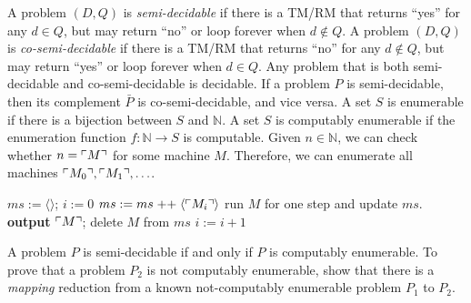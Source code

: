  A problem $(D,Q)$ is \emph{semi-decidable} if there is a TM/RM that returns ``yes'' for any $d \in Q$, but may return ``no'' or loop forever when $d \notin Q$.
 A problem $(D, Q)$ is \emph{co-semi-decidable} if there is a TM/RM that returns ``no'' for any $d \notin Q$, but may return ``yes'' or loop forever when $d \in Q$.
 Any problem that is both semi-decidable and co-semi-decidable is decidable.
 If a problem $P$ is semi-decidable, then its complement $\bar{P}$ is co-semi-decidable, and vice versa.
 A set $S$ is enumerable if there is a bijection between $S$ and $\mathbb{N}$.
 A set $S$ is computably enumerable if the enumeration function $f: \mathbb{N} \to S$ is computable.
 Given $n \in \mathbb{N}$, we can check whether $n = \ulcorner M \urcorner$ for some machine $M$. Therefore, we can enumerate all machines $\ulcorner M_0 \urcorner,\ulcorner M_1 \urcorner,\ldots$.
\begin{algorithmic}
    \State $ms := \langle\rangle$; $i := 0$
        \State $ms := ms \mathrel{++} \langle\ulcorner M_i \urcorner\rangle$
            \State run $M$ for one step and update $ms$.
                \State \textbf{output} $\ulcorner M \urcorner$; delete $M$ from $ms$
            \EndIf
        \EndFor
        \State $i := i+1$
    \EndWhile
\end{algorithmic}
 A problem $P$ is semi-decidable if and only if $P$ is computably enumerable.
 To prove that a problem $P_2$ is not computably enumerable, show that there is a \emph{mapping} reduction from a known not-computably enumerable problem $P_1$ to $P_2$.
